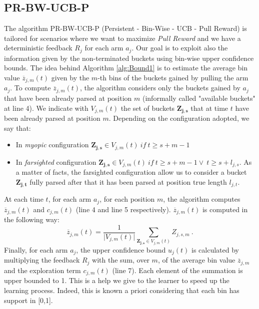 \subsection{PR-BW-UCB-P}
The algorithm PR-BW-UCB-P (Persistent - Bin-Wise - UCB - Pull Reward)  is tailored for scenarios where we want to maximize \emph{Pull Reward} and we have a deterministic feedback $R_j$ for each arm $a_j$. Our goal is to exploit also the information given by the non-terminated buckets using bin-wise upper confidence bounds. The idea behind Algorithm \ref{alg:Bound1} is to estimate the average bin value $\overline{z}_{j,m}(t)$ given by the $m$-th bins of the buckets gained by pulling the arm $a_j$. To compute $\overline{z}_{j,m}(t)$, the algorithm considers only the buckets gained by $a_j$ that have been already parsed at position $m$ (informally called "available buckets" at line 4). We indicate with $V_{j,m}(t)$ the set of buckets $\boldsymbol{Z_{j,s}}$ that at time $t$ have been already parsed at position $m$. Depending on the configuration adopted, we say that:
\begin{itemize}
	\item In \emph{myopic} configuration  $\boldsymbol{Z_{j,s}} \in V_{j,m}(t) \ if \ t\geq s+m-1$
	\item In \emph{farsighted} configuration  $\boldsymbol{Z_{j,s}} \in V_{j,m}(t) \ if \ t\geq s+m-1 \vee \ t \geq s+l_{j,s} $. As a matter of facts, the farsighted configuration allow us to consider a bucket $\boldsymbol{Z_{j,t}}$ fully parsed after that it has been parsed at position true length $l_{j,t}$. 
\end{itemize}


At each time $t$, for each arm $a_j$, for each position $m$, the algorithm computes $\overline{z}_{j,m}(t)$ and $c_{j,m}(t)$ (line 4 and line 5 respectively). $\overline{z}_{j,m}(t)$ is computed in the following way: $$\overline{z}_{j,m}(t) = \frac{1}{\vert V_{j,m}(t) \vert} \sum_{\boldsymbol{Z_{j,s}} \in V_{j,m}(t)} Z_{j,s,m}\ .$$
Finally, for each arm $a_j$, the upper confidence bound $u_j(t)$ is calculated by multiplying the feedback $R_j$  with the sum, over $m$, of the average bin value $\overline{z}_{j,m}$ and the exploration term  $c_{j,m}(t)$  (line 7). Each element of the summation is upper bounded to 1. This is a help we give to the learner to speed up the learning process. Indeed, this is known a priori considering that each bin has support in [0,1]. 









